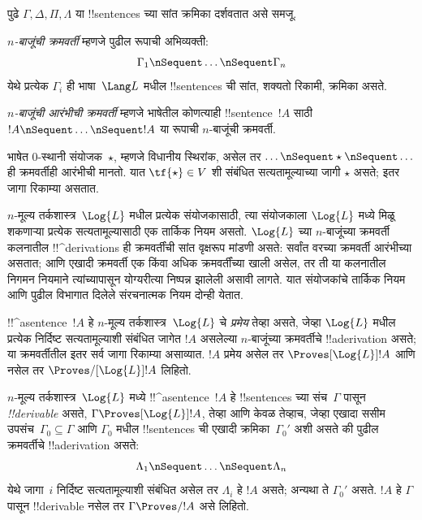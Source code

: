 \documentclass[../../../include/open-logic-section]{subfiles}
\begin{document}


पुढे $\Gamma, \Delta, \Pi, \Lambda$ या !!{sentence}s च्या
सांत क्रमिका दर्शवतात असे समजू.

\begin{defn}[क्रमवर्ती]
\emph{$n$-बाजूंची क्रमवर्ती} म्हणजे पुढील रूपाची अभिव्यक्ती:
\[
\Gamma_1 \nSequent \dots \nSequent \Gamma_n
\]
येथे प्रत्येक $\Gamma_i$ ही भाषा~$\Lang L$ मधील
!!{sentence}s ची सांत, शक्यतो रिकामी, क्रमिका असते.
\end{defn}

\begin{defn}[आरंभीची क्रमवर्ती]
\emph{$n$-बाजूंची आरंभीची क्रमवर्ती} म्हणजे भाषेतील कोणत्याही
!!{sentence}~$!A$ साठी $!A \nSequent \dots \nSequent !A$
या रूपाची $n$-बाजूंची क्रमवर्ती.

भाषेत $0$-स्थानी संयोजक~$\star$, म्हणजे विधानीय स्थिरांक,
असेल तर $\dots \nSequent \star \nSequent \dots$ ही क्रमवर्तीही
आरंभीची मानतो. यात $\tf{\star} \in V$ शी संबंधित
सत्यतामूल्याच्या जागी $\star$ असते; इतर जागा रिकाम्या असतात.
\end{defn}

$n$-मूल्य तर्कशास्त्र~$\Log{L}$ मधील प्रत्येक संयोजकासाठी,
त्या संयोजकाला $\Log{L}$ मध्ये मिळू शकणाऱ्या प्रत्येक
सत्यतामूल्यासाठी एक तार्किक नियम असतो. $\Log{L}$ च्या
$n$-बाजूंच्या क्रमवर्ती कलनातील !!^{derivation}s ही क्रमवर्तींची
सांत वृक्षरूप मांडणी असते: सर्वांत वरच्या क्रमवर्ती आरंभीच्या असतात;
आणि एखादी क्रमवर्ती एक किंवा अधिक क्रमवर्तींच्या खाली असेल,
तर ती या कलनातील निगमन नियमाने त्यांच्यापासून योग्यरीत्या
निष्पन्न झालेली असावी लागते. यात संयोजकांचे तार्किक नियम
आणि पुढील विभागात दिलेले संरचनात्मक नियम दोन्ही येतात.

\begin{defn}[प्रमेये]
!!^a{sentence}~$!A$ हे $n$-मूल्य तर्कशास्त्र~$\Log{L}$ चे
\emph{प्रमेय} तेव्हा असते, जेव्हा $\Log{L}$ मधील प्रत्येक निर्दिष्ट
सत्यतामूल्याशी संबंधित जागेत $!A$ असलेल्या $n$-बाजूंच्या
क्रमवर्तीचे !!a{derivation} असते; या क्रमवर्तीतील
इतर सर्व जागा रिकाम्या असाव्यात. $!A$ प्रमेय असेल तर
$\Proves[\Log{L}] !A$ आणि नसेल तर $\Proves/[\Log{L}] !A$ लिहितो.
\end{defn}

\begin{defn}[!!^{derivability}]
$n$-मूल्य तर्कशास्त्र~$\Log{L}$ मध्ये !!^a{sentence}~$!A$
हे !!{sentence}s च्या संच~$\Gamma$ पासून \emph{!!{derivable}}
असते, $\Gamma \Proves[\Log{L}] !A$, तेव्हा आणि केवळ तेव्हाच,
जेव्हा एखादा ससीम उपसंच~$\Gamma_0 \subseteq \Gamma$
आणि $\Gamma_0$ मधील !!{sentence}s ची एखादी क्रमिका~$\Gamma_0'$
अशी असते की पुढील क्रमवर्तीचे !!a{derivation} असते:
\[ \Lambda_1 \nSequent \dots \nSequent \Lambda_n \]
येथे जागा~$i$ निर्दिष्ट सत्यतामूल्याशी संबंधित असेल तर
$\Lambda_i$ हे $!A$ असते; अन्यथा ते $\Gamma_0'$ असते.
$!A$ हे $\Gamma$ पासून !!{derivable} नसेल तर
$\Gamma \Proves/ !A$ असे लिहितो.
\end{defn}
\end{document}
